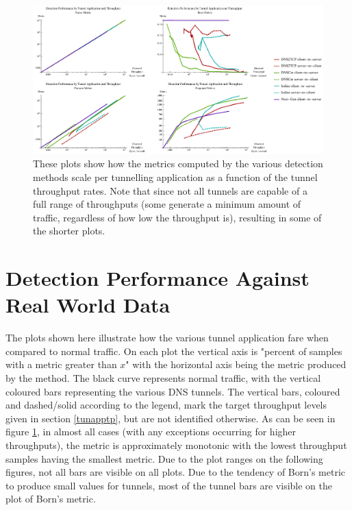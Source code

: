 \documentclass[12pt]{report}
\theoremstyle{remark}
\theoremstyle{definition}
\theoremstyle{definition}
\theoremstyle{definition}
\begin{document}
\begin{landscape}
\begin{figure}
\centering
\includegraphics[width=1.4\textwidth]{figures/mpbtt.pdf}
\caption[Scaling of Detection Metrics by Tunnel Throughput]{These plots show how
the metrics computed by the various detection methods scale per tunnelling
application as a function of the tunnel throughput rates. Note that since not
all tunnels are capable of a full range of throughputs (some generate a minimum
amount of traffic, regardless of how low the throughput is), resulting in some
of the shorter plots.}
\label{mbtt}
\end{figure}
\end{landscape}

\section{Detection Performance Against Real World Data}
\label{detection-perf}

The plots shown here illustrate how the various tunnel application fare when
compared to normal traffic. On each plot the vertical axis is "percent of
samples with a metric greater than $x$" with the horizontal axis being the
metric produced by the method. The black curve represents normal traffic, with
the vertical coloured bars representing the various DNS tunnels. The vertical bars,
coloured and dashed/solid according to the legend, mark the target throughput
levels given in section \ref{tunapptp}, but are not identified otherwise. As can
be seen in figure \ref{mbtt}, in almost all cases (with any exceptions occurring for higher throughputs), the metric is approximately
monotonic with the lowest throughput samples having the smallest metric. Due to
the plot ranges on the following figures, not all bars are visible on all plots.
Due to the tendency of Born's metric to produce small values for tunnels, most
of the tunnel bars are visible on the plot of Born's metric.
\end{document}
